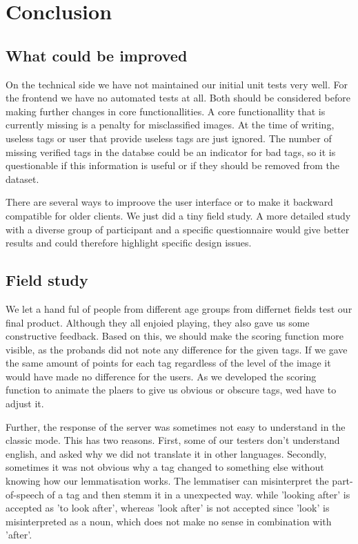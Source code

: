 \section{Conclusion}
\label{g1:sec:conclusion}

\subsection{What could be improved}
\label{g1:sec:conclusion:improved}
On the technical side we have not maintained our initial unit tests very well. For the frontend we have no automated tests at all. Both should be considered before making further changes in core functionallities.
A core functionallity that is currently missing is a penalty for misclassified images. At the time of writing, useless tags or user that provide useless tags are just ignored. The number of missing verified tags in the databse could be an indicator for bad tags, so it is questionable if this information is useful or if they should be removed from the dataset.

There are several ways to improove the user interface or to make it backward compatible for older clients. We just did a tiny field study. A more detailed study with a diverse group of participant and a specific questionnaire would give better results and could therefore highlight specific design issues.

\subsection{Field study}
\label{g1:sec:conclusion:fieldstudy}
We let a hand ful of people from different age  groups from differnet fields test our final product.
Although they all enjoied playing, they also gave us some constructive feedback.
Based on this, we should make the scoring function more visible, as the probands did not note any difference for the given tags.
If we gave the same amount of points for each tag regardless of the level of the image it would have made no difference for the users.
As we developed the scoring function to animate the plaers to give us obvious or obscure tags, wed have to adjust it.

Further, the response of the server was sometimes not easy to understand in the classic mode.
This has two reasons.
First, some of our testers don't understand english, and asked why we did not translate it in other languages. 
Secondly, sometimes it was not obvious why a tag changed to something else without knowing how our lemmatisation works.
The lemmatiser can misinterpret the part-of-speech of a tag and then stemm it in a unexpected way.
while 'looking after' is accepted as 'to look after', whereas 'look after' is not accepted since 'look' is misinterpreted as a noun, which does not make no sense in combination with 'after'.

